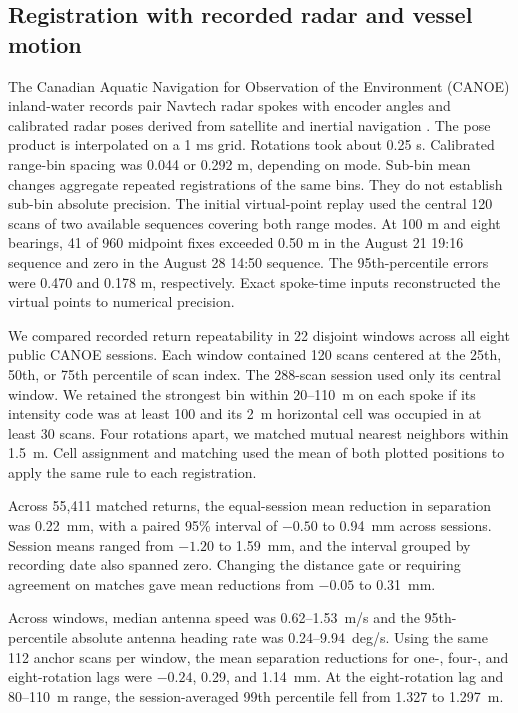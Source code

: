 \subsection{Registration with recorded radar and vessel motion}
\label{sec:canoe-registration}

The Canadian Aquatic Navigation for Observation of the Environment (CANOE) inland-water records pair Navtech radar spokes with encoder angles and calibrated radar poses derived from satellite and inertial navigation \cite{UTIAS2026CANOE}. The pose product is interpolated on a 1 ms grid. Rotations took about 0.25 s. Calibrated range-bin spacing was 0.044 or 0.292 m, depending on mode. Sub-bin mean changes aggregate repeated registrations of the same bins. They do not establish sub-bin absolute precision. The initial virtual-point replay used the central 120 scans of two available sequences covering both range modes. At 100 m and eight bearings, 41 of 960 midpoint fixes exceeded 0.50 m in the August 21 19:16 sequence and zero in the August 28 14:50 sequence. The 95th-percentile errors were 0.470 and 0.178 m, respectively. Exact spoke-time inputs reconstructed the virtual points to numerical precision.

We compared recorded return repeatability in 22 disjoint windows across all eight public CANOE sessions. Each window contained 120 scans centered at the 25th, 50th, or 75th percentile of scan index. The 288-scan session used only its central window. We retained the strongest bin within 20--110~m on each spoke if its intensity code was at least 100 and its 2~m horizontal cell was occupied in at least 30 scans. Four rotations apart, we matched mutual nearest neighbors within 1.5~m. Cell assignment and matching used the mean of both plotted positions to apply the same rule to each registration.

Across 55,411 matched returns, the equal-session mean reduction in separation was 0.22~mm, with a paired 95\% interval of $-0.50$ to 0.94~mm across sessions. Session means ranged from $-1.20$ to 1.59~mm, and the interval grouped by recording date also spanned zero. Changing the distance gate or requiring agreement on matches gave mean reductions from $-0.05$ to 0.31~mm.

Across windows, median antenna speed was 0.62--1.53~m/s and the 95th-percentile absolute antenna heading rate was 0.24--9.94~deg/s. Using the same 112 anchor scans per window, the mean separation reductions for one-, four-, and eight-rotation lags were $-0.24$, 0.29, and 1.14~mm. At the eight-rotation lag and 80--110~m range, the session-averaged 99th percentile fell from 1.327 to 1.297~m.

